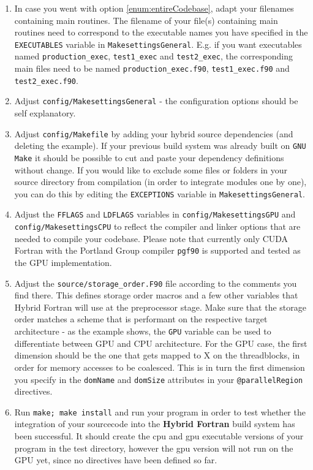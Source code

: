 {\begin{enumerate}
\begin{enumerate}
   \end{enumerate}
 \item In case you went with option \ref{enum:entireCodebase}, adapt your filenames containing main routines. The filename of your file(s) containing main routines need to correspond to the executable names you have specified in the \verb|EXECUTABLES| variable in \verb|MakesettingsGeneral|. E.g. if you want executables named \verb|production_exec|, \verb|test1_exec| and \verb|test2_exec|, the corresponding main files need to be named \verb|production_exec.f90|, \verb|test1_exec.f90| and \verb|test2_exec.f90|.
 \item Adjust \verb|config/MakesettingsGeneral| - the configuration options should be self explanatory.
 \item Adjust \verb|config/Makefile| by adding your hybrid source dependencies (and deleting the example). If your previous build system was already built on \verb|GNU Make| it should be possible to cut and paste your dependency definitions without change. If you would like to exclude some files or folders in your source directory from compilation (in order to integrate modules one by one), you can do this by editing the \verb|EXCEPTIONS| variable in \verb|MakesettingsGeneral|.
 \item Adjust the \verb|FFLAGS| and \verb|LDFLAGS| variables in \verb|config/MakesettingsGPU| and \verb|config/MakesettingsCPU| to reflect the compiler and linker options that are needed to compile your codebase. Please note that currently only CUDA Fortran with the Portland Group compiler \verb|pgf90| is supported and tested as the GPU implementation.
 \item Adjust the \verb|source/storage_order.F90| file according to the comments you find there. This defines storage order macros and a few other variables that Hybrid Fortran will use at the preprocessor stage. Make sure that the storage order matches a scheme that is performant on the respective target architecture - as the example shows, the \verb|GPU| variable can be used to differentiate between GPU and CPU architecture. For the GPU case, the first dimension should be the one that gets mapped to X on the threadblocks, in order for memory accesses to be coalesced. This is in turn the first dimension you specify in the \verb|domName| and \verb|domSize| attributes in your \verb|@parallelRegion| directives.
 \item Run \verb|make; make install| and run your program in order to test whether the integration of your sourcecode into the \textbf{Hybrid Fortran} build system has been successful. It should create the cpu and gpu executable versions of your program in the test directory, however the gpu version will not run on the GPU yet, since no directives have been defined so far.

\end{enumerate}}
